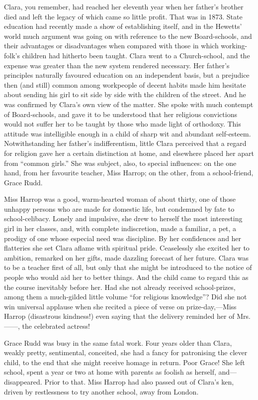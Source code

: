 Clara, you remember, had reached her eleventh year when her father's
brother died {}and left the legacy of which came so little profit. That
was in 1873. State education had recently made a show of establishing
itself, and in the Hewetts' world much argument was going on with
reference to the new Board-schools, and their advantages or
disadvantages when compared with those in which working-folk's children
had hitherto been taught. Clara went to a Church-school, and the expense
was greater than the new system rendered necessary. Her father's
principles naturally favoured education on an independent basis, but a
prejudice then (and still) common among workpeople of decent habits made
him hesitate about sending his girl to sit side by side with the
children of the street. And he was confirmed by Clara's own view of the
matter. She spoke with much contempt of Board-schools, and gave it to be
understood that her religious convictions would not suffer her to be
taught by those who made light of orthodoxy. This attitude was
intelligible enough in a child of sharp wit and abundant self-esteem.
{}Notwithstanding her father's indifferentism, little Clara perceived
that a regard for religion gave her a certain distinction at home, and
elsewhere placed her apart from ``common girls.'' She was subject, also,
to special influences: on the one hand, from her favourite teacher, Miss
Harrop; on the other, from a school-friend, Grace Rudd.

Miss Harrop was a good, warm-hearted woman of about thirty, one of those
unhappy persons who are made for domestic life, but condemned by fate to
school-celibacy. Lonely and impulsive, she drew to herself the most
interesting girl in her classes, and, with complete indiscretion, made a
familiar, a pet, a prodigy of one whose especial need was discipline. By
her confidences and her flatteries she set Clara aflame with spiritual
pride. Ceaselessly she excited her to ambition, remarked on her gifts,
made dazzling forecast of her future. Clara was to be a teacher first of
all, but only that she might be introduced to the notice of people who
would aid her to better things. And the {}child came to regard this as
the course inevitably before her. Had she not already received
school-prizes, among them a much-gilded little volume ``for religious
knowledge''? Did she not win universal applause when she recited a piece
of verse on prize-day,---Miss Harrop (disastrous kindness!) even saying
that the delivery reminded her of Mrs. {{------}}, the celebrated
actress!

Grace Rudd was busy in the same fatal work. Four years older than Clara,
weakly pretty, sentimental, conceited, she had a fancy for patronising
the clever child, to the end that she might receive homage in return.
Poor Grace! She left school, spent a year or two at home with parents as
foolish as herself, and---disappeared. Prior to that. Miss Harrop had
also passed out of Clara's ken, driven by restlessness to try another
school, away from London.

